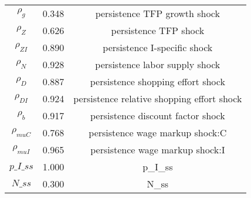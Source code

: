 \begin{center}
\begin{longtable}{ccc}
${\rho_g}$ 	 & 	 0.348 	 & 	 persistence TFP growth shock\\
${\rho_Z}$ 	 & 	 0.626 	 & 	 persistence TFP shock\\
${\rho_{ZI}}$ 	 & 	 0.890 	 & 	 persistence I-specific shock\\
${\rho_N}$ 	 & 	 0.928 	 & 	 persistence labor supply shock\\
${\rho_D}$ 	 & 	 0.887 	 & 	 persistence shopping effort shock\\
${\rho_{DI}}$ 	 & 	 0.924 	 & 	 persistence relative shopping effort shock\\
${\rho_b}$ 	 & 	 0.917 	 & 	 persistence discount factor shock\\
${\rho_{muC}}$ 	 & 	 0.768 	 & 	 persistence wage markup shock:C\\
${\rho_{muI}}$ 	 & 	 0.965 	 & 	 persistence wage markup shock:I\\
$p\_I\_ss$ 	 & 	 1.000 	 & 	 p\_I\_ss\\
$N\_ss$ 	 & 	 0.300 	 & 	 N\_ss\\
\bottomrule%
\end{longtable}
\end{center}
